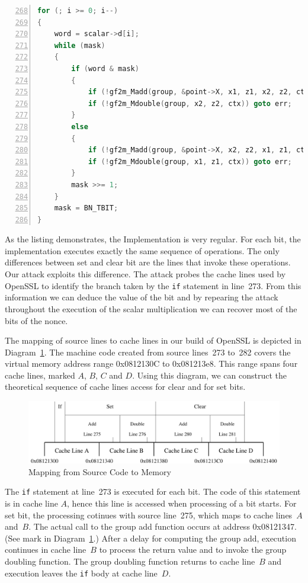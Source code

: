 \documentclass{llncs}
\begin{document}
\begin{lstlisting}[numbers=left,numbersep=5pt,language=C,firstnumber=268,float=htb,caption=OpenSSL Implementation of the Montgomery Ladder,label=lst:openssl]
for (; i >= 0; i--)
{
    word = scalar->d[i];
    while (mask)
    {
        if (word & mask)
        {
            if (!gf2m_Madd(group, &point->X, x1, z1, x2, z2, ctx)) goto err;
            if (!gf2m_Mdouble(group, x2, z2, ctx)) goto err;
        }
        else
        {
            if (!gf2m_Madd(group, &point->X, x2, z2, x1, z1, ctx)) goto err;
            if (!gf2m_Mdouble(group, x1, z1, ctx)) goto err;
        }
        mask >>= 1;
    }
    mask = BN_TBIT;
}
\end{lstlisting}

As the listing demonstrates, the Implementation is very regular.
For each bit, the implementation executes exactly the same sequence of operations.
The only differences between set and clear bit are the lines that invoke these operations.
Our attack exploits this difference.
The attack probes the cache lines used by OpenSSL to identify the branch taken by the \texttt{if}
statement in line~273.
From this information we can deduce the value of the bit and by repearing the attack throughout
the execution of the scalar multiplication we can recover most of the bits of the nonce.


The mapping of source lines to cache lines in our build of OpenSSL is depicted in Diagram~\ref{dgm:memory}.
The machine code created from source lines~273 to~282 covers the virtual memory address range 0x0812130C
to 0x081213e8.
This range spans four cache lines, marked $A$, $B$, $C$ and $D$.
Using this diagram, we can construct the theoretical sequence of cache lines access for clear and for set bits.

\begin{figure}[htb]
\centering\includegraphics[width=\columnwidth]{images/memory}
\caption{Mapping from Source Code to Memory\label{dgm:memory}}
\end{figure}

The \texttt{if} statement at line~273 is executed for each bit.  
The code of this statement is in cache line $A$, hence this line is accessed when processing of a bit starts.
For set bit, the processing cotinues with source line~275, which maps to cache lines~$A$ and~$B$.
The actual call to the group add function occurs at address 0x08121347.
(See mark in Diagram~\ref{dgm:memory}.)
After a delay for computing the group add, execution continues in cache line~$B$ to process the return value and 
to invoke the group doubling function.
The group doubling function returns to cache line~$B$ and execution leaves the \texttt{if} body at cache line~$D$.
\end{document}
